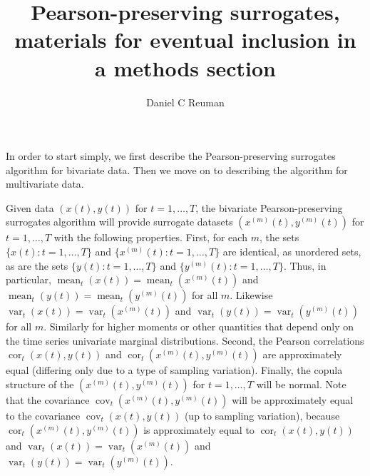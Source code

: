 \documentclass[letterpaper,11pt]{article}
\newcommand{\mean}{\operatorname{mean}}
\newcommand{\var}{\operatorname{var}}
\newcommand{\cor}{\operatorname{cor}}
\newcommand{\cov}{\operatorname{cov}}
\begin{document}
\title{Pearson-preserving surrogates, materials for eventual inclusion in a methods section}
\author{Daniel C Reuman}
\maketitle

\noindent In order to start simply, we first describe the Pearson-preserving surrogates 
algorithm for bivariate data. Then we move on to describing the algorithm
for multivariate data. 

Given data $(x(t),y(t))$ for $t=1,\ldots,T$, the bivariate
Pearson-preserving surrogates algorithm will provide surrogate datasets
$(x^{(m)}(t),y^{(m)}(t))$ for $t=1,\ldots,T$ with the following properties.
First, for each $m$,
the sets $\{x(t) : t=1,\ldots,T\}$ and $\{x^{(m)}(t) : t=1,\ldots,T\}$
are identical, as unordered sets, as are the sets 
$\{y(t) : t=1,\ldots,T\}$ and $\{y^{(m)}(t) : t=1,\ldots,T\}$. Thus,
in particular, $\mean_t(x(t))=\mean_t(x^{(m)}(t))$ and 
$\mean_t(y(t))=\mean_t(y^{(m)}(t))$ for all $m$. Likewise
$\var_t(x(t))=\var_t(x^{(m)}(t))$ and 
$\var_t(y(t))=\var_t(y^{(m)}(t))$ for all $m$. Similarly for
higher moments or other quantities that depend only on the time series
univariate marginal distributions.
Second, the Pearson correlations $\cor_t(x(t),y(t))$
and $\cor_t(x^{(m)}(t),y^{(m)}(t))$ are approximately equal (differing 
only due to a type of sampling variation). Finally, the copula 
structure of the $(x^{(m)}(t),y^{(m)}(t))$ for $t=1,\ldots,T$
will be normal. Note that the covariance
$\cov_t(x^{(m)}(t),y^{(m)}(t))$ will be approximately equal to the covariance
$\cov_t(x(t),y(t))$ (up to sampling variation), because 
$\cor_t(x^{(m)}(t),y^{(m)}(t))$ is approximately equal to 
$\cor_t(x(t),y(t))$ and $\var_t(x(t))=\var_t(x^{(m)}(t))$ and 
$\var_t(y(t))=\var_t(y^{(m)}(t))$.
\end{document}
